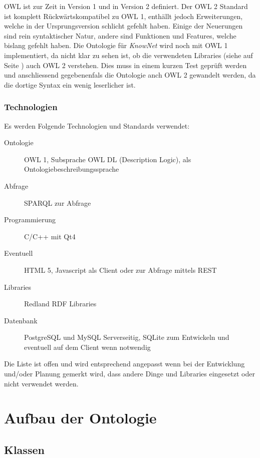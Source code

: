 \documentclass[
    11pt,
    latin1,
    a4paper,
    oneside
]{scrreprt}
\begin{document}
OWL ist zur Zeit in Version 1 und in Version 2 definiert. Der OWL 2 Standard\cite{W3COWL2} ist komplett R\"uckw\"artskompatibel zu OWL 1, enth\"allt jedoch Erweiterungen, welche in der Ursprungsversion schlicht gefehlt haben. Einige der Neuerungen sind rein syntaktischer Natur, andere sind Funktionen und Features, welche bislang gefehlt haben. Die Ontologie f\"ur \emph{KnowNet} wird noch mit OWL 1 implementiert, da nicht klar zu sehen ist, ob die verwendeten Libraries (siehe  auf Seite \pageref{sec:technologies}) auch OWL 2 verstehen. Dies muss in einem kurzen Test gepr\"uft werden und anschliessend gegebenenfals die Ontologie anch OWL 2 gewandelt werden, da die dortige Syntax ein wenig leserlicher ist.

\subsection{Technologien} \label{sec:technologies}

Es werden Folgende Technologien und Standards verwendet:

\begin{description}
  \item[Ontologie] OWL 1, Subsprache OWL DL (Description Logic), als Ontologiebeschreibungssprache
  \item[Abfrage] SPARQL\cite{SPARQL} zur Abfrage
  \item[Programmierung] C/C++ mit Qt4\cite{QT}
  \item[Eventuell] HTML 5, Javascript als Client oder zur Abfrage mittels REST
  \item[Libraries] Redland RDF Libraries\cite{LIBRDF}
  \item[Datenbank] PostgreSQL und MySQL Serverseitig, SQLite zum Entwickeln und eventuell auf dem Client wenn notwendig
\end{description}

Die Liste ist offen und wird entsprechend angepasst wenn bei der Entwicklung und/oder Planung gemerkt wird, dass andere Dinge und Libraries eingesetzt oder nicht verwendet werden.

\chapter{Aufbau der Ontologie} \label{sec:ontology}


\section{Klassen} \label{sec:class}
\end{document}
